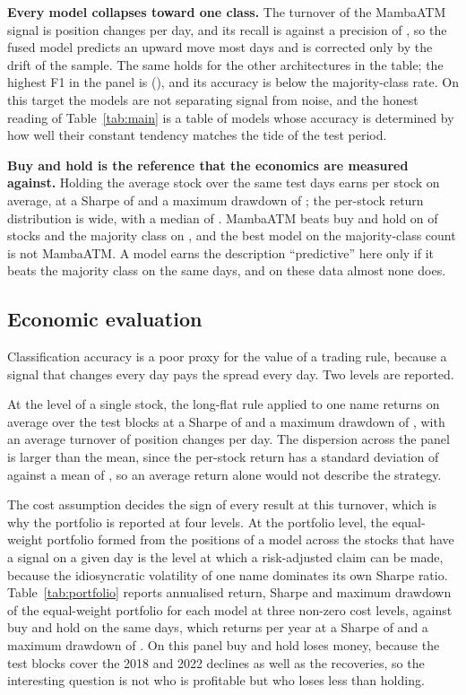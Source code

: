 \documentclass[pdflatex,sn-mathphys-ay]{sn-jnl}
\theoremstyle{thmstyleone}%
\theoremstyle{thmstyletwo}%
\theoremstyle{thmstyletwo}%
\begin{document}
\textbf{Every model collapses toward one class.} The turnover of the MambaATM signal is
\turnProp{} position changes per day, and its recall is \recallProp{} against a precision of
\precProp, so the fused model predicts an upward move most days and is corrected only by the drift of
the sample. The same holds for the other architectures in the table; the highest F1 in the panel is
\fOneBest{} (\fOneBestName), and its accuracy is below the majority-class rate. On this target the
models are not separating signal from noise, and the honest reading of Table~\ref{tab:main} is a
table of models whose accuracy is determined by how well their constant tendency matches the tide of
the test period.

\textbf{Buy and hold is the reference that the economics are measured against.} Holding the average
stock over the same test days earns \retBH{} per stock on average, at a Sharpe of \shBH{} and a
maximum drawdown of \ddBH{}; the per-stock return distribution is wide, with a median of
\medRetBH{}. MambaATM beats buy and hold on \beatBHProp{} of stocks and the majority class on
\beatMajProp{}, and the best model on the majority-class count is not MambaATM. A model earns the
description ``predictive''
here only if it beats the majority class on the same days, and on these data almost none does.

\subsection{Economic evaluation}

Classification accuracy is a poor proxy for the value of a trading rule, because a signal that
changes every day pays the spread every day. Two levels are reported.

At the level of a single stock, the long-flat rule applied to one name returns
\retProp{} on average over the test blocks at a Sharpe of \shProp{} and a maximum drawdown of
\ddProp, with an average turnover of \turnProp{} position changes per day. The dispersion across the
panel is larger than the mean, since the per-stock return has a standard deviation of \retPropSd{}
against a mean of \retProp, so an average return alone would not describe the strategy.

The cost assumption decides the sign of every result at this turnover, which is why the portfolio is
reported at four levels. At the portfolio level, the equal-weight portfolio formed from the positions of a model across the
stocks that have a signal on a given day is the level at which a risk-adjusted claim can be made,
because the idiosyncratic volatility of one name dominates its own Sharpe ratio. Table~\ref{tab:portfolio}
reports annualised return, Sharpe and maximum drawdown of the equal-weight portfolio for each model
at three non-zero cost levels, against buy and hold on the same days, which returns \portAnnBH{} per
year at a Sharpe of \portShBH{} and a maximum drawdown of \portDDBH. On this panel buy and hold loses
money, because the test blocks cover the 2018 and 2022 declines as well as the recoveries, so the
interesting question is not who is profitable but who loses less than holding.
\end{document}

